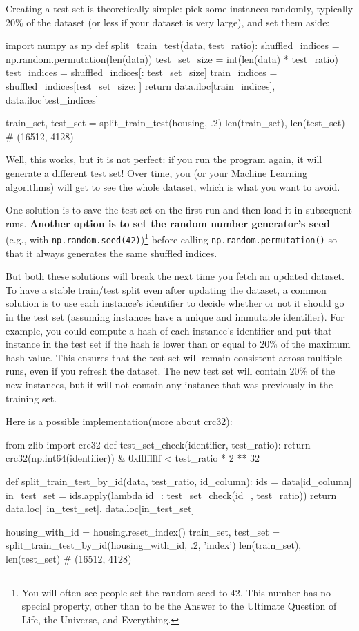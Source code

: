 Creating a test set is theoretically simple: pick some instances randomly, typically
20\% of the dataset (or less if your dataset is very large), and set them aside:
\begin{pyc}
import numpy as np
def split_train_test(data, test_ratio):
    shuffled_indices = np.random.permutation(len(data))
    test_set_size = int(len(data) * test_ratio)
    test_indices = shuffled_indices[: test_set_size]
    train_indices = shuffled_indices[test_set_size: ]
    return data.iloc[train_indices], data.iloc[test_indices]

train_set, test_set = split_train_test(housing, .2)
len(train_set), len(test_set)
# (16512, 4128)
\end{pyc}

Well, this works, but it is not perfect: if you run the program again, it will generate a different test set! Over time, you (or your Machine Learning algorithms) will get to
see the whole dataset, which is what you want to avoid.

One solution is to save the test set on the first run and then load it in subsequent
runs. \textbf{Another option is to set the random number generator’s seed} (e.g., with \verb|np.random.seed(42)|)\footnote{You will often see people set the random seed to 42. This number has no special property, other than to be the
Answer to the Ultimate Question of Life, the Universe, and Everything.} before calling \verb|np.random.permutation()| so that it always generates
the same shuffled indices.

But both these solutions will break the next time you fetch an updated dataset. To
have a stable train/test split even after updating the dataset, a common solution is to
use each instance’s identifier to decide whether or not it should go in the test set
(assuming instances have a unique and immutable identifier). For example, you could
compute a hash of each instance’s identifier and put that instance in the test set if the
hash is lower than or equal to 20\% of the maximum hash value. This ensures that the
test set will remain consistent across multiple runs, even if you refresh the dataset.
The new test set will contain 20\% of the new instances, but it will not contain any
instance that was previously in the training set.

Here is a possible implementation(more about \href{https://baike.baidu.com/item/CRC32/7460858}{crc32}):
\begin{pyc}
from zlib import crc32
def test_set_check(identifier, test_ratio):
    return crc32(np.int64(identifier)) & 0xffffffff < test_ratio * 2 ** 32

def split_train_test_by_id(data, test_ratio, id_column):
    ids = data[id_column]
    in_test_set = ids.apply(lambda id_: test_set_check(id_, test_ratio))
    return data.loc[~in_test_set], data.loc[in_test_set]

housing_with_id = housing.reset_index()
train_set, test_set = split_train_test_by_id(housing_with_id, .2, 'index')
len(train_set), len(test_set)
# (16512, 4128)
\end{pyc}

